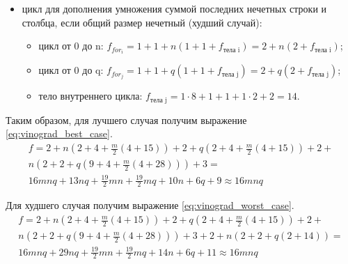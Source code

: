 \documentclass[12pt]{report}
\begin{document}
\begin{itemize}
\begin{itemize}
            \item цикл для дополнения умножения суммой последних нечетных строки и столбца,
            если общий размер нечетный (худший случай):
            \begin{itemize}
                \item цикл от 0 до n: $f_{for_i}=1 + 1 + n(1 + 1 + f_{\text{тела i}}) = 2 + n(2 + f_{\text{тела i}})$;
                \item цикл от 0 до q: $f_{for_j}=1 + 1 +q(1 + 1 + f_{\text{тела j}}) = 2 + q(2 + f_{\text{тела j}})$;
                \item тело внутреннего цикла: $f_{\text{тела j}} = 1 \cdot 8 + 1 + 1 + 1 \cdot 2 + 2  = 14$.
            \end{itemize}

        \end{itemize}
    \end{itemize}

    Таким образом, для лучшего случая получим выражение \ref{eq:vinograd_best_case}.
    \begin{equation}
        \label{eq:vinograd_best_case}
        \begin{array}{ll}
            f = 2 + n(2 + 4 + \frac{m}{2}(4 + 15)) + 2 + q(2 + 4 + \frac{m}{2}(4 + 15)) + 2 + \\
            n(2 + 2 + q(9 + 4 + \frac{m}{2}(4 + 28))) + 3 =                                   \\
            16mnq + 13nq + \frac{19}{2}mn + \frac{19}{2}mq + 10n + 6q + 9 \approx 16 mnq
        \end{array}
    \end{equation}

    Для худшего случая получим выражение \ref{eq:vinograd_worst_case}.
    \begin{equation}
        \label{eq:vinograd_worst_case}
        \begin{array}{ll}
            f = 2 + n(2 + 4 + \frac{m}{2}(4 + 15)) + 2 + q(2 + 4 + \frac{m}{2}(4 + 15)) + 2 + \\
            n(2 + 2 + q(9 + 4 + \frac{m}{2}(4 + 28))) + 3 + 2 + n(2 + 2 + q(2 + 14))=         \\
            16mnq + 29nq + \frac{19}{2}mn + \frac{19}{2}mq + 14n + 6q + 11 \approx 16 mnq
        \end{array}
    \end{equation}
\end{document}
